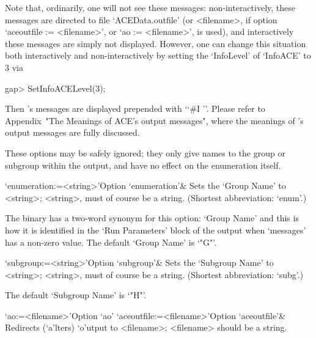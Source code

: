 Note   that,  ordinarily,  one   will   not   see   these    messages:
non-interactively,   these   messages    are    directed    to    file
`ACEData.outfile'   (or   <filename>,   if   option   `aceoutfile   :=
<filename>', or `ao := <filename>', is used), and interactively  these
messages are simply  not  displayed.  However,  one  can  change  this
situation both interactively and   non-interactively  by  setting  the
`InfoLevel' of `InfoACE' to 3 via

\begintt
gap> SetInfoACELevel(3);
\endtt

Then {\ACE}'s messages are  displayed  prepended  with  \lq{}`\#I  ''.
Please refer to Appendix~"The  Meanings  of  ACE's  output  messages",
where the meanings of {\ACE}'s output messages are fully discussed.

\enditems


These options may be safely ignored; they only give names to the group
or subgroup within the {\ACE}  output,  and  have  no  effect  on  the
enumeration itself.

\beginitems

\>`enumeration:=<string>'{Option `enumeration'}&
Sets the `Group Name' to <string>;  <string>,  must  of  course  be  a
string. (Shortest abbreviation: `enum'.)

The {\ACE} binary has a two-word synonym for this option: `Group Name'
and this is how it is identified in the \lq{}Run Parameters' block  of
the {\ACE} output when `messages' has a non-zero  value.  The  default
`Group Name' is `"G"'.

\>`subgroup:=<string>'{Option `subgroup'}& Sets the `Subgroup Name' to
<string>; <string>, must of course be a string.
(Shortest abbreviation: `subg'.) 

The default `Subgroup Name' is `"H"'.

\enditems


\beginitems

\>`ao:=<filename>'{Option `ao'}
\>`aceoutfile:=<filename>'{Option `aceoutfile'}&
Redirects (`a'lters) `o'utput to <filename>; <filename>  should  be  a
string.

